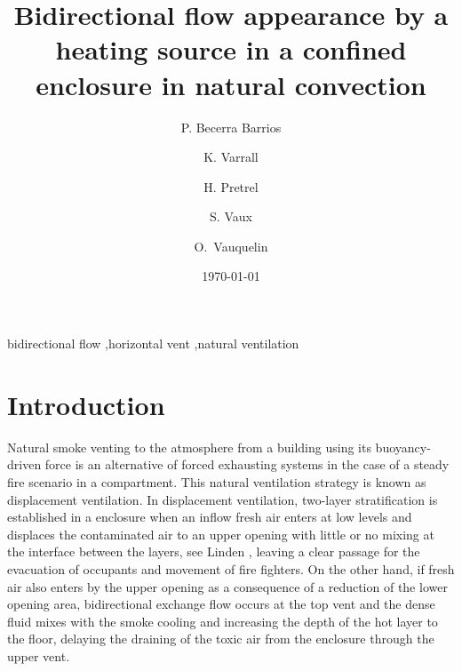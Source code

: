 \documentclass[preprint,12pt]{elsarticle}
\date{\today}
\title{}
\begin{document}
\begin{frontmatter}

\title{Bidirectional flow appearance by a heating source in a confined
  enclosure in natural convection}

\author[label1,label3]{P. Becerra Barrios}

\address[label1]{Laboratoire IUSTI, UMR CNRS 7343, Aix-Marseille Université, \mbox{5 rue Enrico Fermi, 13453 Marseille, France}}
\address[label2]{ \mbox{Institut de Radioprotection et de Sûreté
    Nucléaire (PSN-RES/SA2I)}, \mbox{Centre de Cadarache, 13115 Saint-Paul-Lez-Durance}, France}
\address[label3]{School of Mechanical Engineering, University of Costa Rica, Costa Rica} 

\author[label1]{K. Varrall}

\author[label2]{H. Pretrel}

\author[label2]{S. Vaux}

\author[label1]{\mbox{O. Vauquelin}}

\begin{abstract}


\end{abstract}

\begin{keyword}
bidirectional flow \sep horizontal vent \sep natural ventilation
\end{keyword}

\end{frontmatter}

\linenumbers

\section{Introduction}
\label{sec:org50e52e7}
Natural smoke venting to the atmosphere from a building using its buoyancy-driven force is an alternative of forced exhausting systems in the case of a steady fire scenario in a compartment. This natural ventilation strategy is known as displacement ventilation. In displacement ventilation, two-layer stratification is established in a enclosure when an inflow fresh air enters at low levels and displaces the contaminated air to an upper opening with little or no mixing at the interface between the layers, see Linden \cite{linden_1999}, leaving a clear passage for the evacuation of occupants and movement of fire fighters. On the other hand, if fresh air also enters by the upper opening as a consequence of a reduction of the lower opening area, bidirectional exchange flow occurs at the top vent and the dense fluid mixes with the smoke cooling and increasing the depth of the hot layer to the floor, delaying the draining of the toxic air from the enclosure through the upper vent.
\end{document}
